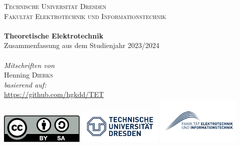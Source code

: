 
%

\makeatletter
\begin{titlepage}
	\center
	\vspace*{3cm}
	\textsc{\LARGE Technische Universität Dresden}\\[0.3cm] \textsc{\Large
		Fakultät Elektrotechnik und Informationstechnik}\\[1.5cm] \HRule\\[0.4cm]
	{\huge\bfseries Theoretische Elektrotechnik}\\[0.6cm] \Large Zusammenfassung
	aus dem Studienjahr 2023/2024\\[0.3cm] \HRule\\[2.5cm] {\large\textit{Mitschriften von}}\\
	Henning \textsc{Dierks}\\
	{\large\textit{basierend auf:}}\\ \url{https://github.com/hgkdd/TET}
	\\[2.5cm]
	{	\includegraphics[width=0.3\textwidth]{res/CC_Logo}}
	\vfill
	\vfill
	\includegraphics[width=0.3\textwidth]{res/tud}
	\includegraphics[width=0.3\textwidth]{res/eui}
	\\[1cm]
	\vfill
\end{titlepage}

\makeatother
\hypersetup{bookmarksdepth=3} %
\setcounter{tocdepth}{1}
